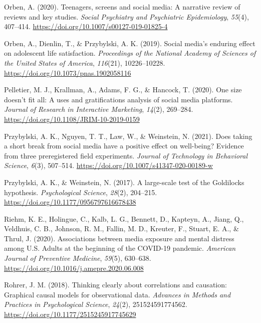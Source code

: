 \documentclass[
  man,mask]{apa7}
\newlength{\cslhangindent}
\newlength{\cslentryspacingunit} %
\newenvironment{CSLReferences}[2] %
 {%
  \setlength{\parindent}{0pt}
  \ifodd #1
  \let\oldpar\par
  \def\par{\hangindent=\cslhangindent\oldpar}
  \fi
  \setlength{\parskip}{#2\cslentryspacingunit}
 }%
 {}
\begin{document}
\begin{CSLReferences}{1}{0}
\leavevmode{}%
Orben, A. (2020). Teenagers, screens and social media: A narrative review of reviews and key studies. \emph{Social Psychiatry and Psychiatric Epidemiology}, \emph{55}(4), 407--414. \url{https://doi.org/10.1007/s00127-019-01825-4}

\leavevmode{}%
Orben, A., Dienlin, T., \& Przybylski, A. K. (2019). Social media's enduring effect on adolescent life satisfaction. \emph{Proceedings of the National Academy of Sciences of the United States of America}, \emph{116}(21), 10226--10228. \url{https://doi.org/10.1073/pnas.1902058116}

\leavevmode{}%
Pelletier, M. J., Krallman, A., Adams, F. G., \& Hancock, T. (2020). One size doesn't fit all: A uses and gratifications analysis of social media platforms. \emph{Journal of Research in Interactive Marketing}, \emph{14}(2), 269--284. \url{https://doi.org/10.1108/JRIM-10-2019-0159}

\leavevmode{}%
Przybylski, A. K., Nguyen, T. T., Law, W., \& Weinstein, N. (2021). Does taking a short break from social media have a positive effect on well-being? {Evidence} from three preregistered field experiments. \emph{Journal of Technology in Behavioral Science}, \emph{6}(3), 507--514. \url{https://doi.org/10.1007/s41347-020-00189-w}

\leavevmode{}%
Przybylski, A. K., \& Weinstein, N. (2017). A large-scale test of the {Goldilocks} hypothesis. \emph{Psychological Science}, \emph{28}(2), 204--215. \url{https://doi.org/10.1177/0956797616678438}

\leavevmode{}%
Riehm, K. E., Holingue, C., Kalb, L. G., Bennett, D., Kapteyn, A., Jiang, Q., Veldhuis, C. B., Johnson, R. M., Fallin, M. D., Kreuter, F., Stuart, E. A., \& Thrul, J. (2020). Associations between media exposure and mental distress among {U}.{S}. Adults at the beginning of the {COVID-19} pandemic. \emph{American Journal of Preventive Medicine}, \emph{59}(5), 630--638. \url{https://doi.org/10.1016/j.amepre.2020.06.008}

\leavevmode{}%
Rohrer, J. M. (2018). Thinking clearly about correlations and causation: {Graphical} causal models for observational data. \emph{Advances in Methods and Practices in Psychological Science}, \emph{24}(2), 251524591774562. \url{https://doi.org/10.1177/2515245917745629}


\end{CSLReferences}
\end{document}
